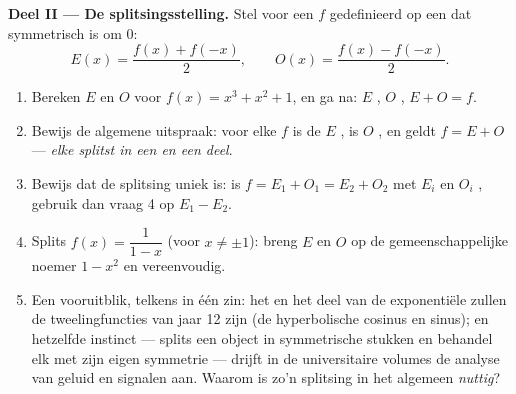 \begin{problem}
\medskip
\noindent\textbf{Deel II --- De splitsingsstelling.}
Stel voor een  $f$ gedefinieerd op een  dat symmetrisch is om
$0$:
\[
E(x) = \frac{f(x) + f(-x)}{2},
\qquad
O(x) = \frac{f(x) - f(-x)}{2} .
\]
\begin{enumerate}[resume]
  \item Bereken $E$ en $O$ voor $f(x) = x^3 + x^2 + 1$, en ga na: $E$ ,
        $O$ , $E + O = f$.
  \item Bewijs de algemene uitspraak: voor elke $f$ is de  $E$ ,
        is $O$ , en geldt $f = E + O$ --- \emph{elke  splitst in
        een  en een  deel}.
  \item Bewijs dat de splitsing uniek is: is $f = E_1 + O_1 = E_2 + O_2$ met
        $E_i$  en $O_i$ , gebruik dan vraag 4 op $E_1 - E_2$.
  \item Splits $f(x) = \dfrac{1}{1 - x}$ (voor $x \neq \pm 1$): breng $E$ en
        $O$ op de gemeenschappelijke noemer $1 - x^2$ en vereenvoudig.
  \item Een vooruitblik, telkens in één zin: het  en het  deel van
        de exponentiële  zullen de tweelingfuncties van jaar 12 zijn
        (de hyperbolische cosinus en sinus); en hetzelfde instinct --- splits
        een object in symmetrische stukken en behandel elk met zijn eigen
        symmetrie --- drijft in de universitaire volumes de analyse van geluid
        en signalen aan. Waarom is zo'n splitsing in het algemeen
        \emph{nuttig}?
\end{enumerate}


\end{problem}
